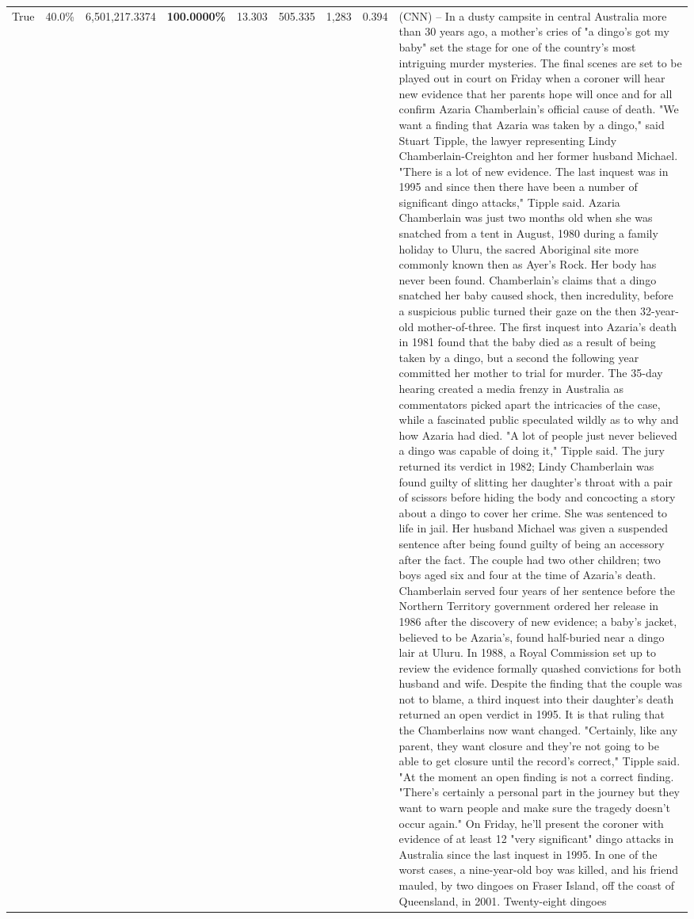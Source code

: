 \begin{table}[H]
\begin{tabular}{lllrlllll}
True & 40.0\% & 6,501,217.3374 & \bfseries \color{red} 100.0000\% & 13.303 & 505.335 & 1,283 & 0.394 & (CNN) -- In a dusty campsite in central Australia more than 30 years ago, a mother's cries of "a dingo's got my baby" set the stage for one of the country's most intriguing murder mysteries. The final scenes are set to be played out in court on Friday when a coroner will hear new evidence that her parents hope will once and for all confirm Azaria Chamberlain's official cause of death. "We want a finding that Azaria was taken by a dingo," said Stuart Tipple, the lawyer representing Lindy Chamberlain-Creighton and her former husband Michael. "There is a lot of new evidence. The last inquest was in 1995 and since then there have been a number of significant dingo attacks," Tipple said. Azaria Chamberlain was just two months old when she was snatched from a tent in August, 1980 during a family holiday to Uluru, the sacred Aboriginal site more commonly known then as Ayer's Rock. Her body has never been found. Chamberlain's claims that a dingo snatched her baby caused shock, then incredulity, before a suspicious public turned their gaze on the then 32-year-old mother-of-three. The first inquest into Azaria's death in 1981 found that the baby died as a result of being taken by a dingo, but a second the following year committed her mother to trial for murder. The 35-day hearing created a media frenzy in Australia as commentators picked apart the intricacies of the case, while a fascinated public speculated wildly as to why and how Azaria had died. "A lot of people just never believed a dingo was capable of doing it," Tipple said. The jury returned its verdict in 1982; Lindy Chamberlain was found guilty of slitting her daughter's throat with a pair of scissors before hiding the body and concocting a story about a dingo to cover her crime. She was sentenced to life in jail. Her husband Michael was given a suspended sentence after being found guilty of being an accessory after the fact. The couple had two other children; two boys aged six and four at the time of Azaria's death. Chamberlain served four years of her sentence before the Northern Territory government ordered her release in 1986 after the discovery of new evidence; a baby's jacket, believed to be Azaria's, found half-buried near a dingo lair at Uluru. In 1988, a Royal Commission set up to review the evidence formally quashed convictions for both husband and wife. Despite the finding that the couple was not to blame, a third inquest into their daughter's death returned an open verdict in 1995. It is that ruling that the Chamberlains now want changed. "Certainly, like any parent, they want closure and they're not going to be able to get closure until the record's correct," Tipple said. "At the moment an open finding is not a correct finding. "There's certainly a personal part in the journey but they want to warn people and make sure the tragedy doesn't occur again." On Friday, he'll present the coroner with evidence of at least 12 "very significant" dingo attacks in Australia since the last inquest in 1995. In one of the worst cases, a nine-year-old boy was killed, and his friend mauled, by two dingoes on Fraser Island, off the coast of Queensland, in 2001. Twenty-eight dingoes 
\end{tabular}
\end{table}
